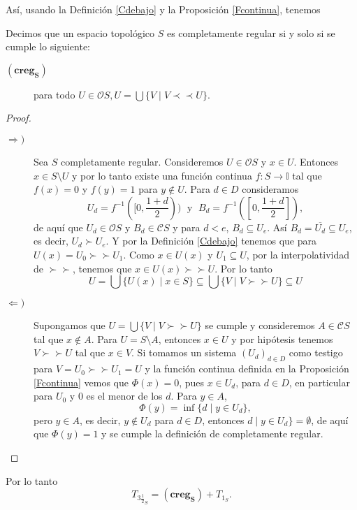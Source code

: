 \documentclass{comunicaciones}
\begin{document}
Así, usando la Definición \ref{Cdebajo} y la Proposición \ref{Fcontinua}, tenemos 

\begin{prop}\label{Crs}
    Decimos que un espacio topológico $S$ es completamente regular si y solo si se cumple lo siguiente:
\begin{description}
\item[$(\mathbf{creg_S})$] para todo $U\in \mathcal{O}S, U=\bigcup\{V\mid V\prec \prec U\}$.
\end{description}
\end{prop}

\begin{proof}
    \begin{description}
        \item[$\Rightarrow )$] Sea $S$ completamente regular. Consideremos $U\in\mathcal{O}S$ y $x\in U$. Entonces $x\in S\setminus U$ y por lo tanto existe una función continua $f\colon S\to \mathbb{I}$ tal que $f(x)=0$ y $f(y)=1$ para $y\notin U$. Para $d\in D$ consideramos
        \[
        U_d=f^{-1}([0, \frac{1+d}{2}))\;\mbox{ y } \;B_d=f^{-1}([0,\frac{1+d}{2}]),
        \]
        de aquí que $U_d\in \mathcal{O}S$ y $B_d\in \mathcal{C}S$ y para $d<e$, $B_d\subseteq U_e$. Así $B_d=\overline{U_d}\subseteq U_e$, es decir, $U_d\succ U_e$. Y por la Definición \ref{Cdebajo} tenemos que para $U(x)=U_0\succ\succ U_1$. Como $x\in U(x)$ y $U_1\subseteq U$, por la interpolatividad de $\succ\succ$, tenemos que $x\in U(x)\succ\succ U$. Por lo tanto
        \[
        U=\bigcup \{U(x)\mid x\in S\}\subseteq \bigcup \{V\mid V\succ\succ U\}\subseteq U
        \]
        \item[$\Leftarrow )$] Supongamos que $U=\bigcup\{V\mid V\succ\succ U\}$ se cumple y consideremos $A\in\mathcal{C}S$ tal que $x\notin A$. Para $U=S\setminus A$, entonces $x\in U$ y por  hipótesis tenemos $V\succ\succ U$ tal que $x\in V$. Si tomamos un sistema $(U_d)_{d\in D}$ como testigo para $V=U_0\succ \succ U_1=U$ y la función continua definida en la Proposición \ref{Fcontinua} vemos que $\Phi(x)=0$, pues $x\in U_d$, para $d\in D$, en particular para $U_0$ y $0$ es el menor de los $d$. Para $y\in A$, 
        \[
        \Phi(y)=\inf\{d\mid y\in U_d\},
        \]
        pero $y\in A$, es decir, $y\notin U_d$ para $d\in D$, entonces $d\mid y\in U_d\}=\emptyset$, de aquí que $\Phi(y)=1$ y se cumple la definición de completamente regular.
    \end{description}
\end{proof}
Por lo tanto 
\[
T_{3\frac{1}{2}_S}=(\mathbf{creg_S})+T_{1_S}.
\]
\end{document}
